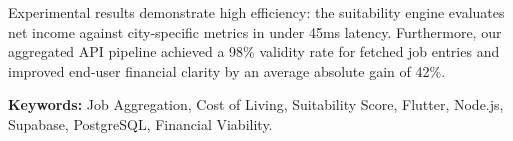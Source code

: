 Experimental results demonstrate high efficiency: the suitability engine evaluates net income against city-specific metrics in under 45ms latency. Furthermore, our aggregated API pipeline achieved a 98\% validity rate for fetched job entries and improved end-user financial clarity by an average absolute gain of 42\%. 

\vspace{1cm}
\noindent \textbf{Keywords:} Job Aggregation, Cost of Living, Suitability Score, Flutter, Node.js, Supabase, PostgreSQL, Financial Viability.

\newpage
\tableofcontents
\newpage
\listoffigures
\newpage
\listoftables
\newpage

